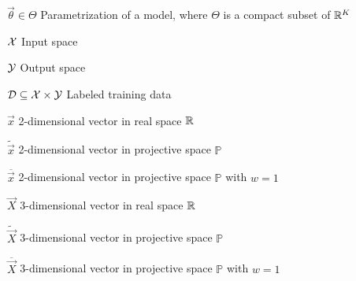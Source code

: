 \begin{abbrv}
    \item

    \item[$\vec{\theta} \in \Theta$] Parametrization of a model, where $\Theta$ is a compact subset of $\mathbb{R}^K$
    \item[$\mathcal{X}$] Input space
    \item[$\mathcal{Y}$] Output space
    \item[$\mathcal{D} \subseteq \mathcal{X} \times \mathcal{Y}$] Labeled training data

    \item

    \item[$\vec{x}$] 2-dimensional vector in real space $\mathbb{R}$
    \item[$\tilde{\vec{x}}$] 2-dimensional vector in projective space $\mathbb{P}$
    \item[$\overline{\vec{x}}$] 2-dimensional vector in projective space $\mathbb{P}$ with $w=1$
    \item[$\vec{X}$] 3-dimensional vector in real space $\mathbb{R}$
    \item[$\tilde{\vec{X}}$] 3-dimensional vector in projective space $\mathbb{P}$
    \item[$\overline{\vec{X}}$] 3-dimensional vector in projective space $\mathbb{P}$ with $w=1$
\end{abbrv}
